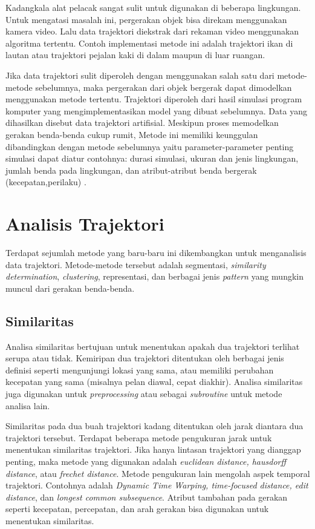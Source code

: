 \par Kadangkala alat pelacak sangat sulit untuk digunakan di beberapa lingkungan. Untuk mengatasi masalah ini, pergerakan objek bisa direkam menggunakan kamera video. Lalu data trajektori diekstrak dari rekaman video menggunakan algoritma tertentu. Contoh implementasi metode ini adalah trajektori ikan di lautan atau trajektori pejalan kaki di dalam maupun di luar ruangan.

\par Jika data trajektori sulit diperoleh dengan menggunakan salah satu dari metode-metode sebelumnya, maka pergerakan dari objek bergerak dapat dimodelkan  menggunakan metode tertentu. Trajektori diperoleh dari hasil simulasi program komputer yang mengimplementasikan model yang dibuat sebelumnya. Data yang dihasilkan disebut data trajektori artifisial. Meskipun proses memodelkan gerakan benda-benda cukup rumit, Metode ini memiliki keunggulan dibandingkan dengan metode sebelumnya yaitu parameter-parameter penting simulasi dapat diatur contohnya: durasi simulasi, ukuran dan jenis lingkungan, jumlah benda pada lingkungan, dan atribut-atribut benda bergerak (kecepatan,perilaku) \cite{wiratma:19:computations}.

\section{Analisis Trajektori}
Terdapat sejumlah metode yang baru-baru ini dikembangkan untuk menganalisis data trajektori. Metode-metode tersebut adalah segmentasi, \textit{similarity determination}, \textit{clustering}, representasi, dan berbagai jenis \textit{pattern} yang mungkin muncul dari gerakan benda-benda.

\subsection{Similaritas}
Analisa similaritas bertujuan untuk menentukan apakah dua trajektori terlihat serupa atau tidak. Kemiripan dua trajektori ditentukan oleh berbagai jenis definisi seperti mengunjungi lokasi yang sama, atau memiliki perubahan kecepatan yang sama (misalnya pelan diawal, cepat diakhir). Analisa similaritas juga  digunakan untuk \textit{preprocessing} atau sebagai \textit{subroutine} untuk metode analisa lain.

\par Similaritas pada dua buah trajektori kadang ditentukan oleh jarak diantara dua trajektori tersebut. Terdapat beberapa metode pengukuran jarak untuk menentukan similaritas trajektori. Jika hanya lintasan trajektori yang dianggap penting, maka metode yang digunakan adalah \textit{euclidean distance, hausdorff distance}, atau \textit{frechet distance}. Metode pengukuran lain mengolah aspek temporal trajektori. Contohnya adalah \textit{Dynamic Time Warping, time-focused distance, edit distance}, dan \textit{longest common subsequence}. Atribut tambahan pada gerakan seperti kecepatan, percepatan, dan arah gerakan bisa digunakan untuk menentukan similaritas.

